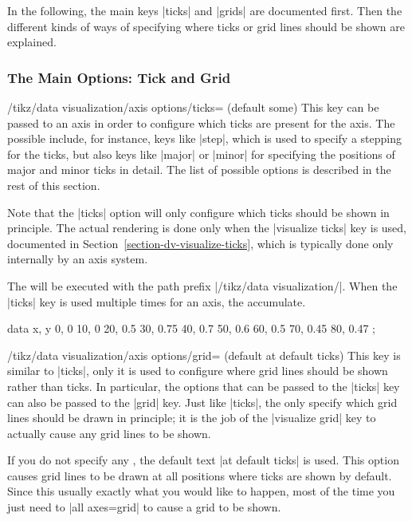 In the following, the main keys |ticks| and |grids| are documented first. Then the different kinds of ways of specifying where ticks or grid lines should be shown are explained.


\subsubsection{The Main Options: Tick and Grid}

\begin{key}{/tikz/data visualization/axis options/ticks= (default some)}
    This key can be passed to an axis in order to configure which ticks are present for the axis. The possible  include, for instance, keys like |step|, which is used to specify a stepping for the ticks, but also keys like |major| or |minor| for specifying the positions of major and minor ticks in detail. The list of possible options is described in the rest of this section.

    Note that the |ticks| option will only configure which ticks should be shown in principle. The actual rendering is done only when the |visualize ticks| key is used, documented in Section~\ref{section-dv-visualize-ticks}, which is typically done only internally by an axis system.

    The  will be executed with the path prefix |/tikz/data visualization/|. When the |ticks| key is used multiple times for an axis, the  accumulate.
\begin{codeexample}[width=6cm,preamble={\usetikzlibrary{datavisualization}}]
\tikz \datavisualization [
  scientific axes, visualize as line,
  x axis={ticks={step=24, minor steps between steps=3},
          label=hours}]
  data {
    x, y
    0, 0
    10, 0
    20, 0.5
    30, 0.75
    40, 0.7
    50, 0.6
    60, 0.5
    70, 0.45
    80, 0.47
  };
\end{codeexample}
\end{key}

\begin{key}{/tikz/data visualization/axis options/grid= (default at default ticks)}
    This key is similar to |ticks|, only it is used to configure where grid lines should be shown rather than ticks. In particular, the options that can be passed to the |ticks| key can also be passed to the |grid| key. Just like |ticks|, the  only specify which grid lines should be drawn in principle; it is the job of the |visualize grid| key to actually cause any grid lines to be shown.

    If you do not specify any , the default text |at default ticks| is used. This option causes grid lines to be drawn at all positions where ticks are shown by default. Since this usually exactly what you would like to happen, most of the time you just need to |all axes=grid| to cause a grid to be shown.
\end{key}

